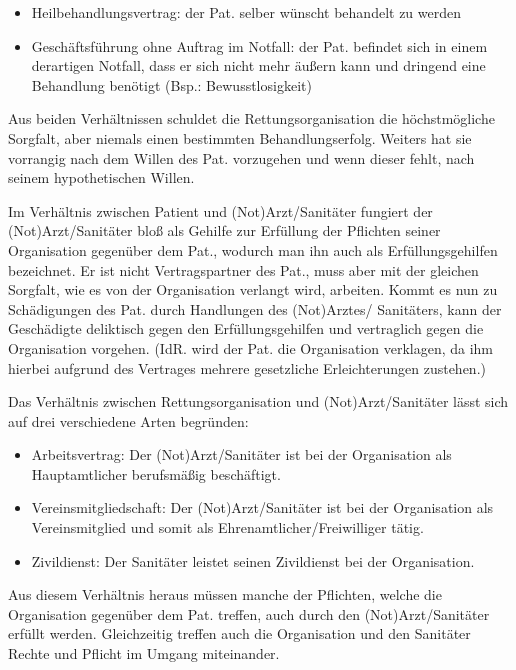 \documentclass{article}
\begin{document}
\begin{itemize}
\item Heilbehandlungsvertrag: der Pat. selber w\"unscht behandelt zu
werden

\item Gesch\"aftsf\"uhrung ohne Auftrag im Notfall: der Pat. befindet
sich in einem derartigen Notfall, dass er sich nicht mehr \"au{\ss}ern
kann und dringend eine Behandlung ben\"otigt (Bsp.: Bewusstlosigkeit)

\end{itemize}
Aus beiden Verh\"altnissen schuldet die Rettungsorganisation die
h\"ochstm\"ogliche Sorgfalt, aber niemals einen bestimmten
Behandlungserfolg. Weiters hat sie vorrangig nach dem Willen des Pat.
vorzugehen und wenn dieser fehlt, nach seinem hypothetischen Willen.

Im Verh\"altnis zwischen Patient und (Not)Arzt/Sanit\"ater fungiert der
(Not)Arzt/Sanit\"ater blo{\ss} als Gehilfe zur Erf\"ullung der
Pflichten seiner Organisation gegen\"uber dem Pat., wodurch man ihn
auch als Erf\"ullungsgehilfen bezeichnet. Er ist nicht Vertragspartner
des Pat., muss aber mit der gleichen Sorgfalt, wie es von der
Organisation verlangt wird, arbeiten. Kommt es nun zu Sch\"adigungen
des Pat. durch Handlungen des (Not)Arztes/ Sanit\"aters, kann der
Gesch\"adigte deliktisch gegen den Erf\"ullungsgehilfen und vertraglich
gegen die Organisation vorgehen. (IdR. wird der Pat. die Organisation
verklagen, da ihm hierbei aufgrund des Vertrages mehrere gesetzliche
Erleichterungen zustehen.)

Das Verh\"altnis zwischen Rettungsorganisation und (Not)Arzt/Sanit\"ater
l\"asst sich auf drei verschiedene Arten begr\"unden:

\begin{itemize}
\item Arbeitsvertrag: Der (Not)Arzt/Sanit\"ater ist bei der Organisation
als Hauptamtlicher berufsm\"a{\ss}ig besch\"aftigt. 

\item Vereinsmitgliedschaft: Der (Not)Arzt/Sanit\"ater ist bei der
Organisation als Vereinsmitglied und somit als
Ehrenamtlicher/Freiwilliger t\"atig. 

\item Zivildienst: Der Sanit\"ater leistet seinen Zivildienst bei der
Organisation.

\end{itemize}
Aus diesem Verh\"altnis heraus m\"ussen manche der Pflichten, welche die
Organisation gegen\"uber dem Pat. treffen, auch durch den
(Not)Arzt/Sanit\"ater erf\"ullt werden. Gleichzeitig treffen auch die
Organisation und den Sanit\"ater Rechte und Pflicht im Umgang
miteinander.
\end{document}
